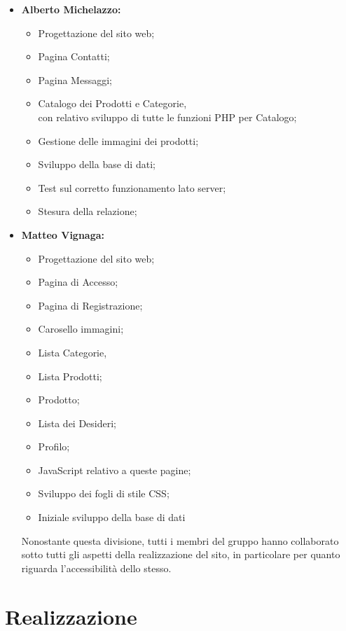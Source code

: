 \documentclass[a4paper, 11pt]{article}
\begin{document}
\begin{itemize}
\begin{itemize}
	\end{itemize}
\item \textbf{Alberto Michelazzo:}
	\begin{itemize}
		\item Progettazione del sito web;
		\item Pagina Contatti;
		\item Pagina Messaggi;
		\item Catalogo dei Prodotti e Categorie, \\ 
		con relativo sviluppo di tutte le funzioni PHP per Catalogo;
	  	\item Gestione delle immagini dei prodotti;
		\item Sviluppo della base di dati;
		\item Test sul corretto funzionamento lato server;
		\item Stesura della relazione;
	\end{itemize}
\item \textbf{Matteo Vignaga:}
	\begin{itemize}
		\item Progettazione del sito web;
		\item Pagina di Accesso;
		\item Pagina di Registrazione;
		\item Carosello immagini;
		\item Lista Categorie,
		\item Lista Prodotti;
		\item Prodotto;
		\item Lista dei Desideri;
		\item Profilo;
		\item JavaScript relativo a queste pagine;
		\item Sviluppo dei fogli di stile CSS;
		\item Iniziale sviluppo della base di dati
	\end{itemize}

	
Nonostante questa divisione, tutti i membri del gruppo hanno collaborato sotto tutti gli aspetti della realizzazione del sito, in particolare per quanto riguarda l'accessibilità dello stesso.
\end{itemize}

\pagebreak

\section{Realizzazione}
\end{document}
